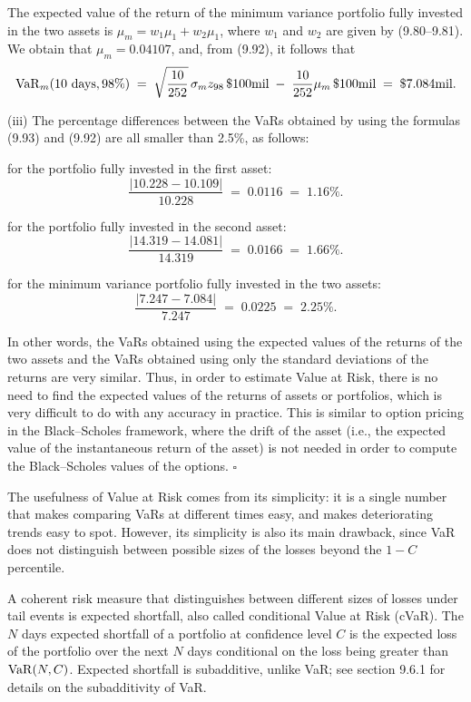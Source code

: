 \begin{answerx}
The expected value of the return of the minimum variance portfolio fully
invested in the two assets is $\mu_m = w_1\mu_1 + w_2\mu_1$,
where $w_1$ and $w_2$ are given by (9.80--9.81). We obtain that $\mu_m =
0.04107$, and, from (9.92), it follows that
\[
\operatorname{VaR}_m(10\text{ days},98\%) \;=\; \sqrt{\frac{10}{252}}\,\sigma_m z_{98}\,\$100\text{mil} \;-\; \frac{10}{252}\mu_m\,\$100\text{mil} \;=\; \$7.084\text{mil}.
\]

(iii) The percentage differences between the VaRs obtained by using the
formulas (9.93) and (9.92) are all smaller than 2.5\%, as follows:

for the portfolio fully invested in the first asset:
\[
\frac{\lvert 10.228-10.109\rvert}{10.228} \;=\; 0.0116 \;=\; 1.16\%.
\]

for the portfolio fully invested in the second asset:
\[
\frac{\lvert 14.319-14.081\rvert}{14.319} \;=\; 0.0166 \;=\; 1.66\%.
\]

for the minimum variance portfolio fully invested in the two assets:
\[
\frac{\lvert 7.247-7.084\rvert}{7.247} \;=\; 0.0225 \;=\; 2.25\%.
\]

In other words, the VaRs obtained using the expected values of the returns of
the two assets and the VaRs obtained using only the standard deviations of
the returns are very similar. Thus, in order to estimate Value at Risk, there
is no need to find the expected values of the returns of assets or
portfolios, which is very difficult to do with any accuracy in practice. This
is similar to option pricing in the Black--Scholes framework, where the drift
of the asset (i.e., the expected value of the instantaneous return of the
asset) is not needed in order to compute the Black--Scholes values of the
options.
\hfill$\square$
\end{answerx}

The usefulness of Value at Risk comes from its simplicity: it is a single
number that makes comparing VaRs at different times easy, and makes
deteriorating trends easy to spot. However, its simplicity is also its main
drawback, since VaR does not distinguish between possible sizes of the losses
beyond the $1-C$ percentile.

A coherent risk measure that distinguishes between different sizes of losses
under tail events is expected shortfall, also called conditional Value at
Risk (cVaR). The $N$ days expected shortfall of a portfolio at confidence
level $C$ is the expected loss of the portfolio over the next $N$ days
conditional on the loss being greater than $\operatorname{VaR}(N,C)$. Expected shortfall is
subadditive, unlike VaR; see section 9.6.1 for details on the subadditivity
of VaR.

